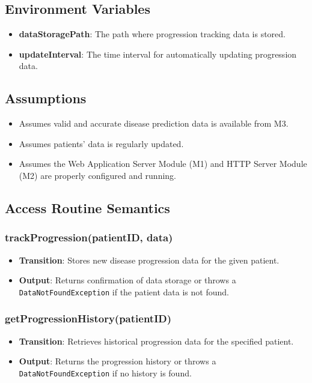 \documentclass[12pt, titlepage]{article}
\begin{document}
\subsection{Environment Variables}
\begin{itemize}
\item \textbf{dataStoragePath}: The path where progression tracking data is stored.
\item \textbf{updateInterval}: The time interval for automatically updating progression data.
\end{itemize}

\subsection{Assumptions}
\begin{itemize}
\item Assumes valid and accurate disease prediction data is available from M3.
\item Assumes patients' data is regularly updated.
\item Assumes the Web Application Server Module (M1) and HTTP Server Module (M2) are properly configured and running.
\end{itemize}

\subsection{Access Routine Semantics}
\subsubsection{trackProgression(patientID, data)}

\begin{itemize}
    \item \textbf{Transition}: Stores new disease progression data for the given patient.
    \item \textbf{Output}: Returns confirmation of data storage or throws a \texttt{DataNotFoundException} if the patient data is not found.
\end{itemize}

\subsubsection{getProgressionHistory(patientID)}

\begin{itemize}
    \item \textbf{Transition}: Retrieves historical progression data for the specified patient.
    \item \textbf{Output}: Returns the progression history or throws a \texttt{DataNotFoundException} if no history is found.
\end{itemize}
\end{document}
